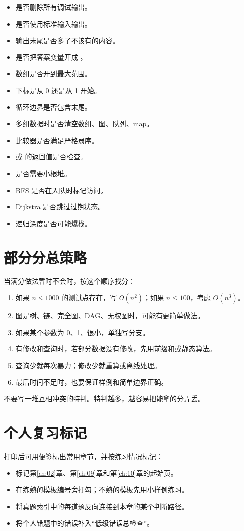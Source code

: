 \begin{itemize}
  \item 是否删除所有调试输出。
  \item 是否使用标准输入输出。
  \item 输出末尾是否多了不该有的内容。
  \item 是否把答案变量开成 。
  \item 数组是否开到最大范围。
  \item 下标是从 0 还是从 1 开始。
  \item 循环边界是否包含末尾。
  \item 多组数据时是否清空数组、图、队列、map。
  \item 比较器是否满足严格弱序。
  \item {} 或  的返回值是否检查。
  \item {} 是否需要小根堆。
  \item BFS 是否在入队时标记访问。
  \item Dijkstra 是否跳过过期状态。
  \item 递归深度是否可能爆栈。
\end{itemize}

\section{部分分总策略}\label{sec:01-10}

当满分做法暂时不会时，按这个顺序找分：

\begin{enumerate}
  \item {}如果 $n \le 1000$ 的测试点存在，写 $O(n^2)$；如果 $n \le 100$，考虑 $O(n^3)$。
  \item {}图是树、链、完全图、DAG、无权图时，可能有更简单做法。
  \item {}如果某个参数为 0、1、很小，单独写分支。
  \item {}有修改和查询时，若部分数据没有修改，先用前缀和或静态算法。
  \item {}查询少就每次暴力；修改少就重算或离线处理。
  \item {}最后时间不足时，也要保证样例和简单边界正确。
\end{enumerate}

不要写一堆互相冲突的特判。特判越多，越容易把能拿的分弄丢。

\section{个人复习标记}\label{sec:01-11}

打印后可用便签标出常用章节，并按练习情况标记：

\begin{itemize}
  \item 标记第\ref{ch:02}章、第\ref{ch:09}章和第\ref{ch:10}章的起始页。
  \item 在练熟的模板编号旁打勾；不熟的模板先用小样例练习。
  \item 将真题索引中的每道题反向连接到本章的某个判断路径。
  \item 将个人错题中的错误补入“低级错误总检查”。
\end{itemize}
